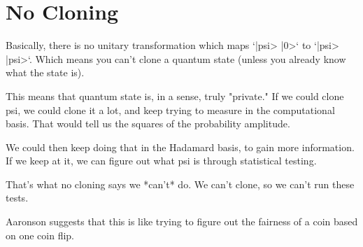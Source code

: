 \section{No Cloning}

Basically, there is no unitary transformation which maps `|psi>
\otimes |0>` to `|psi> \otimes |psi>`. Which means you can't clone
a quantum state (unless you already know what the state is).

This means that quantum state is, in a sense, truly "private." If we
could clone psi, we could clone it a lot, and keep trying to measure
in the computational basis. That would tell us the squares of the
probability amplitude.

We could then keep doing that in the Hadamard basis, to gain more
information. If we keep at it, we can figure out what psi is through
statistical testing.

That's what no cloning says we *can't* do. We can't clone, so we can't
run these tests.

Aaronson suggests that this is like trying to figure out the fairness
of a coin based on one coin flip.
